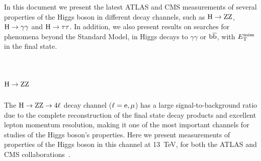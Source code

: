 \documentclass[10pt]{article}
\begin{document}
In this document we present the latest ATLAS and CMS measurements of several
properties of the Higgs boson in different decay channels, such as
${\rm H\to ZZ}$, ${\rm H\to\gamma\gamma}$ and ${\rm H\to\tau\tau}$. In addition,
we also present results on searches for phenomena beyond the Standard Model, in
Higgs decays to $\gamma\gamma$ or ${\rm b\bar{b}}$, with $E_{\rm T}^{\rm miss}$
in the final state.


\section{\boldmath ${\rm H}\to{\rm ZZ}$}

The ${\rm H\to ZZ\to 4\ell}$ decay channel (${\rm \ell = e,\mu}$) has a large
signal-to-background ratio due to the complete reconstruction of the final state
decay products and excellent lepton momentum resolution, making it one of the
most important channels for studies of the Higgs boson's properties. Here we
present measurements of properties of the Higgs boson in this channel at 13~TeV,
for both the ATLAS and CMS collaborations~\cite{Aaboud:2017oem,Sirunyan:2017exp}.
\end{document}
